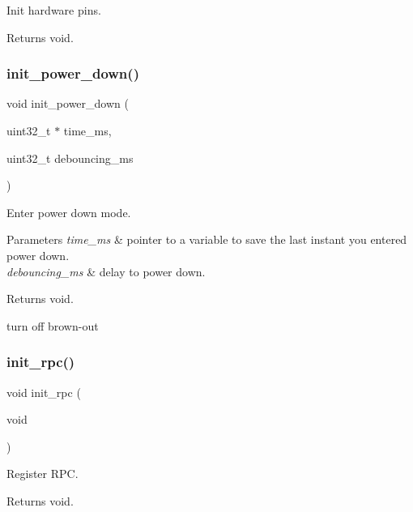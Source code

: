 Init hardware pins. 

\begin{DoxyReturn}{Returns}
void. 
\end{DoxyReturn}
\mbox{\label{rmap_8ino_afb98a0f07c30784284f48271ffe02b97}} 
\subsubsection{\texorpdfstring{init\+\_\+power\+\_\+down()}{init\_power\_down()}}
{\footnotesize\ttfamily void init\+\_\+power\+\_\+down (\begin{DoxyParamCaption}\item[{uint32\+\_\+t $\ast$}]{time\+\_\+ms,  }\item[{uint32\+\_\+t}]{debouncing\+\_\+ms }\end{DoxyParamCaption})}



Enter power down mode. 


\begin{DoxyParams}{Parameters}
{\em time\+\_\+ms} & pointer to a variable to save the last instant you entered power down. \\
\hline
{\em debouncing\+\_\+ms} & delay to power down. \\
\hline
\end{DoxyParams}
\begin{DoxyReturn}{Returns}
void. 
\end{DoxyReturn}
turn off brown-\/out \mbox{\label{rmap_8ino_ad1555e354b3ec88ba71d3a90b06ed014}} 
\subsubsection{\texorpdfstring{init\+\_\+rpc()}{init\_rpc()}}
{\footnotesize\ttfamily void init\+\_\+rpc (\begin{DoxyParamCaption}\item[{void}]{ }\end{DoxyParamCaption})}



Register R\+PC. 

\begin{DoxyReturn}{Returns}
void. 
\end{DoxyReturn}
\mbox{\label{rmap_8ino_ab985cc69f5f573113405b4f118c96d33}} 
